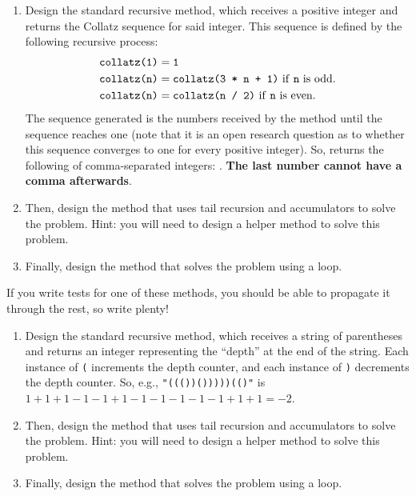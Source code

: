 \begin{enumerate}[label=(\alph*)]
\item Design the standard recursive  method, which receives a positive integer and returns the Collatz sequence for said integer. This sequence is defined by the following recursive process:
\begin{align*}
    \ttt{collatz(1)} &= \ttt{1}\\
    \ttt{collatz(n)} &= \ttt{collatz(3 * n + 1)} \text{ if \ttt{n} is odd.}\\
    \ttt{collatz(n)} &= \ttt{collatz(n / 2)} \text{ if \ttt{n} is even.}
\end{align*}
The sequence generated is the numbers received by the method until the sequence reaches one (note that it is an open research question as to whether this sequence converges to one for every positive integer). So,  returns the following  of comma-separated integers: . \textbf{The last number cannot have a comma afterwards}.

\item Then, design the  method that uses tail recursion and accumulators to solve the problem. Hint: you will need to design a  helper method to solve this problem.

\item Finally, design the  method that solves the problem using a loop.
\end{enumerate}

If you write tests for one of these methods, you should be able to propagate it through the rest, so write plenty!

\begin{enumerate}[label=(\alph*)]
\item Design the standard recursive  method, which receives a string of parentheses and returns an integer representing the ``depth'' at the end of the string. Each instance of \texttt{(} increments the depth counter, and each instance of \texttt{)} decrements the depth counter. So, e.g., \texttt{"((())()))))(()"} is $1+1+1-1-1+1-1-1-1-1-1+1+1=-2$.

\item Then, design the  method that uses tail recursion and accumulators to solve the problem. Hint: you will need to design a  helper method to solve this problem.

\item Finally, design the  method that solves the problem using a loop.
\end{enumerate}

